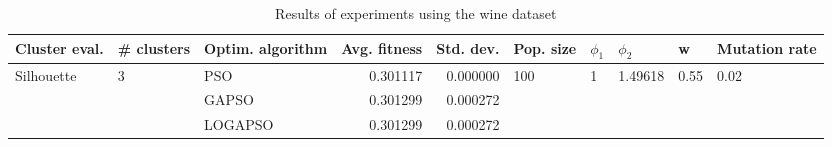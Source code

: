 \begin{table}
\centering
\caption{Results of experiments using the wine dataset}
\begin{tabular}{lllrrlllll}
\toprule
              Cluster eval. &        \# clusters & Optim. algorithm &  Avg. fitness &  Std. dev. &            Pop. size &         $\phi_{1}$ &               $\phi_{2}$ &                     w &         Mutation rate \\
\midrule
\multirow{3}{*}{Silhouette} & \multirow{3}{*}{3} &              PSO &      0.301117 &   0.000000 & \multirow{3}{*}{100} & \multirow{3}{*}{1} & \multirow{3}{*}{1.49618} & \multirow{3}{*}{0.55} & \multirow{3}{*}{0.02} \\
                            &                    &            GAPSO &      0.301299 &   0.000272 &                      &                    &                          &                       &                       \\
                            &                    &          LOGAPSO &      0.301299 &   0.000272 &                      &                    &                          &                       &                       \\
\bottomrule
\end{tabular}
\end{table}
